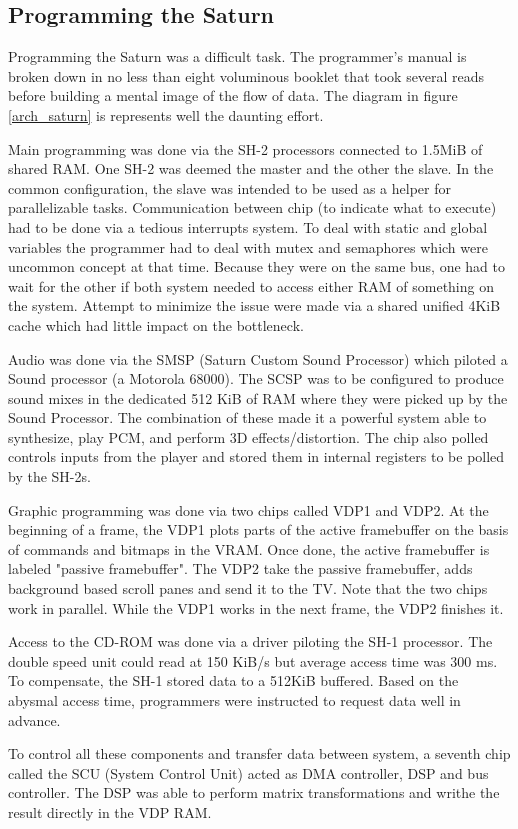 \subsection{Programming the Saturn}
Programming the Saturn was a difficult task. The programmer's manual is broken down in no less than eight voluminous booklet that took several reads before building a mental image of the flow of data. The diagram in figure \ref{arch_saturn} is represents well the daunting effort.\\
\par
Main programming was done via the SH-2 processors connected to 1.5MiB of shared RAM. One SH-2 was deemed the master and the other the slave. In the common configuration, the slave was intended to be used as a helper for parallelizable tasks. Communication between chip (to indicate what to execute) had to be done via a tedious interrupts system. To deal with static and global variables the programmer had to deal with mutex and semaphores which were uncommon concept at that time. Because they were on the same bus, one had to wait for the other if both system needed to access either RAM of something on the system. Attempt to minimize the issue were made via a shared unified 4KiB cache which had little impact on the bottleneck.\\
\par
Audio was done via the SMSP (Saturn Custom Sound Processor) which piloted a Sound processor (a Motorola 68000). The SCSP was to be configured to produce sound mixes in the dedicated 512 KiB of RAM where they were picked up by the Sound Processor. The combination of these made it a powerful system able to synthesize, play PCM, and perform 3D effects/distortion. The chip also polled controls inputs from the player and stored them in internal registers to be polled by the SH-2s.\\
\par
Graphic programming was done via two chips called VDP1 and VDP2. At the beginning of a frame, the VDP1 plots parts of the active framebuffer on the basis of commands and bitmaps in the VRAM. Once done, the active framebuffer is labeled "passive framebuffer". The VDP2 take the passive framebuffer, adds background based scroll panes and send it to the TV. Note that the two chips work in parallel. While the VDP1 works in the next frame, the VDP2 finishes it.\\
\par
Access to the CD-ROM was done via a driver piloting the SH-1 processor. The double speed unit could read at 150 KiB/s but average access time was 300 ms. To compensate, the SH-1 stored data to a 512KiB buffered. Based on the abysmal access time, programmers were instructed to request data well in advance.\\ 
\par
To control all these components and transfer data between system, a seventh chip called the SCU (System Control Unit) acted as DMA controller, DSP and bus controller. The DSP was able to perform matrix transformations and writhe the result directly in the VDP RAM.\\
\par


